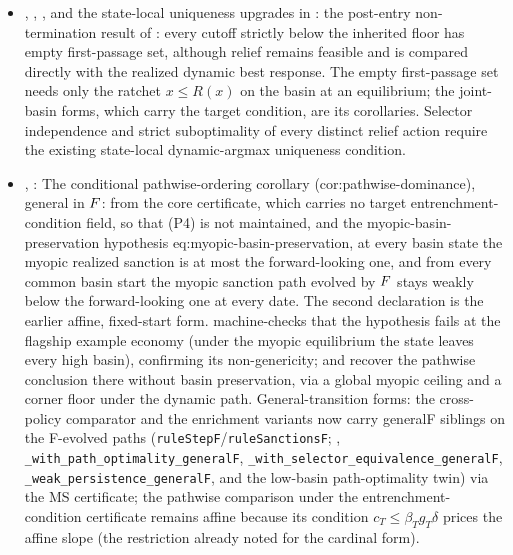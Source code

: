 \begin{itemize}[leftmargin=1.4em,itemsep=1pt]
converge to a jump point that is not fixed. The non-affine ratchet instantiates
the valid bound. Its derived corollary
uses the identically-one sanction rule to sharpen the result at that example economy to
$x_L=x_F=1$ without changing the general theorem or adding an assumption.
\item
{},
,
, and the
state-local uniqueness upgrades in
: the post-entry
non-termination result of :
every cutoff strictly below the inherited floor has empty first-passage
set, although relief remains feasible and is compared directly with the
realized dynamic best response. The empty first-passage set needs only
the ratchet $x\le R(x)$ on the basin at an equilibrium; the
joint-basin forms, which carry the target condition, are its corollaries.
Selector independence and strict
suboptimality of every distinct relief action require the existing
state-local dynamic-argmax uniqueness condition.
\item {}, : The conditional pathwise-ordering corollary (cor:pathwise-dominance), general in $F$: from the core certificate, which carries no target entrenchment-condition field, so that (P4) is not maintained, and the myopic-basin-preservation hypothesis eq:myopic-basin-preservation, at every basin state the myopic realized sanction is at most the forward-looking one, and from every common basin start the myopic sanction path evolved by $F$ stays weakly below the forward-looking one at every date. The second declaration is the earlier affine, fixed-start form.  machine-checks that the hypothesis fails at the flagship example economy (under the myopic equilibrium the state leaves every high basin), confirming its non-genericity;  and  recover the pathwise conclusion there without basin preservation, via a global myopic ceiling and a corner floor under the dynamic path. General-transition forms: the cross-policy comparator and the enrichment variants now carry generalF siblings on the F-evolved paths (\texttt{ruleStepF}/\texttt{ruleSanctionsF}; , \texttt{\_with\_path\_optimality\_generalF}, \texttt{\_with\_selector\_equivalence\_generalF}, \texttt{\_weak\_persistence\_generalF}, and the low-basin path-optimality twin) via the MS certificate; the pathwise comparison under the entrenchment-condition certificate remains affine because its condition $c_T\le\beta_T g_T\delta$ prices the affine slope (the restriction already noted for the cardinal form).

\end{itemize}
